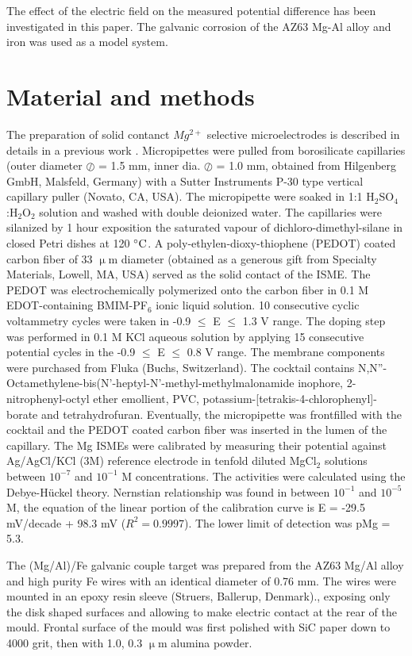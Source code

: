 \documentclass[3p]{elsarticle}
\begin{document}
The effect of the electric field on the measured potential difference has been investigated in this paper. The galvanic corrosion of the AZ63 Mg-Al alloy and iron was used as a model system.

\section{Material and methods}

The preparation of solid contanct $Mg^{2+}$ selective microelectrodes is described in details in a previous work \cite{overmg3}. Micropipettes were pulled from borosilicate capillaries (outer diameter $\oslash$ = 1.5 mm, inner dia. $\oslash$ = 1.0 mm, obtained from Hilgenberg GmbH, Malsfeld, Germany) with a Sutter Instruments P-30 type vertical capillary puller (Novato, CA, USA). The micropipette were soaked in 1:1 H$_2$SO$_4$:H$_2$O$_2$ solution and washed with double deionized water. The capillaries were silanized by 1 hour exposition the saturated vapour of dichloro-dimethyl-silane in closed Petri dishes at 120 $\celsius$. A poly-ethylen-dioxy-thiophene (PEDOT) coated carbon fiber of 33 $\upmu$m diameter (obtained as a generous gift from Specialty Materials, Lowell, MA, USA) served as the solid contact of the ISME. The PEDOT was electrochemically polymerized onto the carbon fiber in 0.1 M EDOT-containing BMIM-PF$_6$ ionic liquid solution. 10 consecutive cyclic voltammetry cycles were taken in -0.9 $\leq$ E $\leq$ 1.3 V range. The doping step was performed in 0.1 M KCl aqueous solution by applying 15 consecutive potential cycles in the -0.9 $\leq$ E $\leq$ 0.8 V range. The membrane components were purchased from Fluka (Buchs, Switzerland). The cocktail contains N,N''-Octamethylene-bis(N'-heptyl-N'-methyl-methylmalonamide inophore, 2-nitrophenyl-octyl ether emollient, PVC, potassium-[tetrakis-4-chlorophenyl]-borate and tetrahydrofuran. Eventually, the micropipette was frontfilled with the cocktail and the PEDOT coated carbon fiber was inserted in the lumen of the capillary.
The Mg ISMEs were calibrated by measuring their potential against Ag/AgCl/KCl (3M) reference electrode in tenfold diluted MgCl$_2$ solutions between $10^{-7}$ and $10^{-1}$ M concentrations. The activities were calculated using the Debye-Hückel theory. Nernstian relationship was found in between $10^{-1}$ and $10^{-5}$ M, the equation of the linear portion of the calibration curve is E = -29.5 mV/decade + 98.3 mV ($R^2=0.9997$). The lower limit of detection was pMg = 5.3. 

The (Mg/Al)/Fe galvanic couple target was prepared from the AZ63 Mg/Al alloy and high purity Fe wires with an identical diameter of 0.76 mm. The wires were mounted in an epoxy resin sleeve (Struers, Ballerup, Denmark)., exposing only the disk shaped surfaces and allowing to make electric contact at the rear of the mould. Frontal surface of the mould was first polished with SiC paper down to 4000 grit, then with 1.0, 0.3 $\upmu$m alumina powder.
\end{document}
